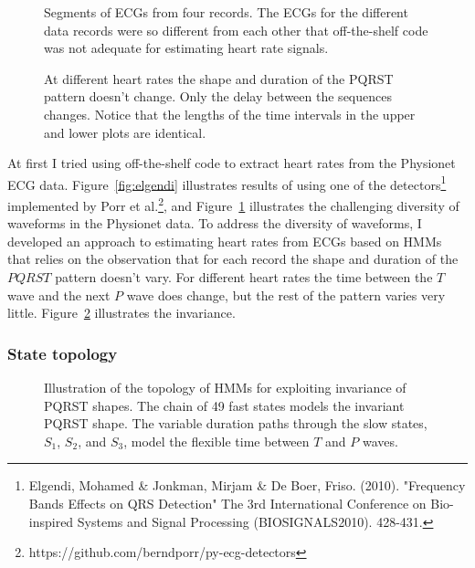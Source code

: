 \begin{figure}
  \caption[Segments of ECGs from four records]%
  {Segments of ECGs from four records.  The ECGs for the different
    data records were so different from each other that off-the-shelf
    code was not adequate for estimating heart rate signals.}
  \label{fig:a03a10b03c02}
\end{figure}

\begin{figure}
  \caption[Invariant PQRST shape]%
  {At different heart rates the shape and duration of the PQRST
    pattern doesn’t change. Only the delay between the sequences
    changes.  Notice that the lengths of the time intervals in the
    upper and lower plots are identical.}
  \label{fig:constant_a03}
\end{figure}

At first I tried using off-the-shelf code to extract heart rates from
the Physionet ECG data.  Figure~\ref{fig:elgendi} illustrates results
of using one of the detectors\footnote{Elgendi, Mohamed \& Jonkman,
  Mirjam \& De Boer, Friso. (2010). "Frequency Bands Effects on QRS
  Detection" The 3rd International Conference on Bio-inspired Systems
  and Signal Processing (BIOSIGNALS2010). 428-431.} implemented by
Porr et al.\footnote{https://github.com/berndporr/py-ecg-detectors},
and Figure~\ref{fig:a03a10b03c02} illustrates the challenging
diversity of waveforms in the Physionet data.  To address the
diversity of waveforms, I developed an approach to estimating heart
rates from ECGs based on HMMs that relies on the observation that for
each record the shape and duration of the $PQRST$ pattern doesn't
vary.  For different heart rates the time between the $T$ wave and the
next $P$ wave does change, but the rest of the pattern varies very
little.  Figure~\ref{fig:constant_a03} illustrates the invariance.

\subsubsection{State topology}
\label{sec:state_topology}

\begin{figure}
  \centering{\resizebox{0.5\textwidth}{!}{}
  }
  \caption[Topology of HMMs for exploiting invariance of PQRST
  shapes]{Illustration of the topology of HMMs for exploiting
    invariance of PQRST shapes. The chain of 49 fast states models the
    invariant PQRST shape.  The variable duration paths through the
    slow states, $S_1$, $S_2$, and $S_3$, model the flexible time
    between $T$ and $P$ waves.}
  \label{fig:ecg_hmm}
\end{figure}

